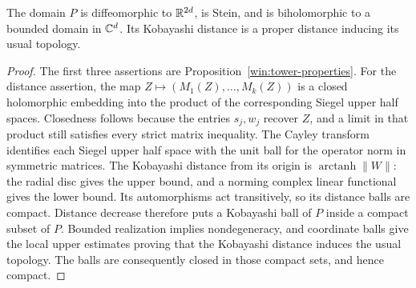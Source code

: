 \begin{lemma}\label{quo:tower}
The domain \(P\) is diffeomorphic to \(\mathbb R^{2d}\), is Stein, and is
biholomorphic to a bounded domain in \(\mathbb C^d\). Its Kobayashi distance
is a proper distance inducing its usual topology.
\end{lemma}
\begin{proof}
The first three assertions are Proposition~\ref{win:tower-properties}.
For the distance assertion, the map
\(Z\mapsto(M_1(Z),\ldots,M_k(Z))\) is a closed holomorphic
embedding into the product of the corresponding Siegel upper half
spaces. Closedness follows because the entries \(s_j,w_j\) recover
\(Z\), and a limit in that product still satisfies every strict
matrix inequality. The Cayley transform identifies each Siegel
upper half space with the unit ball for the operator norm in
symmetric matrices. The Kobayashi distance from its origin is
\(\operatorname{arctanh}\|W\|\): the radial disc gives the upper
bound, and a norming complex linear functional gives the lower
bound. Its automorphisms act transitively, so its distance balls
are compact. Distance decrease therefore puts a Kobayashi
ball of \(P\) inside a compact subset of \(P\). Bounded realization
implies nondegeneracy, and coordinate balls give the local upper
estimates proving that the Kobayashi distance induces the usual
topology. The balls are consequently closed in those compact sets,
and hence compact.
\end{proof}

